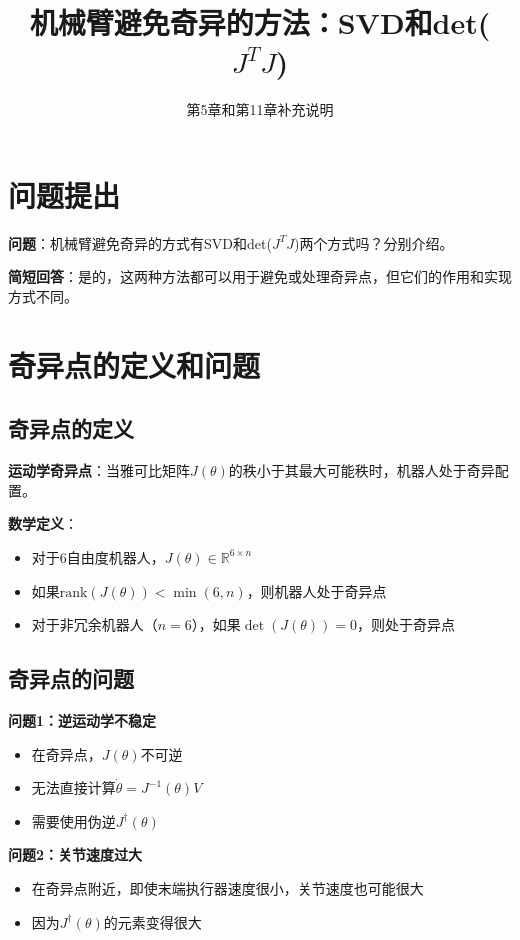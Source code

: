 \documentclass[12pt,a4paper]{article}
\title{机械臂避免奇异的方法：SVD和det($J^T J$)}
\author{第5章和第11章补充说明}
\date{}
\begin{document}
\maketitle

\section{问题提出}

\textbf{问题}：机械臂避免奇异的方式有SVD和det($J^T J$)两个方式吗？分别介绍。

\textbf{简短回答}：是的，这两种方法都可以用于避免或处理奇异点，但它们的作用和实现方式不同。

\section{奇异点的定义和问题}

\subsection{奇异点的定义}

\textbf{运动学奇异点}：当雅可比矩阵$J(\theta)$的秩小于其最大可能秩时，机器人处于奇异配置。

\textbf{数学定义}：
\begin{itemize}
\item 对于6自由度机器人，$J(\theta) \in \mathbb{R}^{6 \times n}$
\item 如果$\text{rank}(J(\theta)) < \min(6, n)$，则机器人处于奇异点
\item 对于非冗余机器人（$n = 6$），如果$\det(J(\theta)) = 0$，则处于奇异点
\end{itemize}

\subsection{奇异点的问题}

\textbf{问题1：逆运动学不稳定}
\begin{itemize}
\item 在奇异点，$J(\theta)$不可逆
\item 无法直接计算$\dot{\theta} = J^{-1}(\theta)V$
\item 需要使用伪逆$J^{\dagger}(\theta)$
\end{itemize}

\textbf{问题2：关节速度过大}
\begin{itemize}
\item 在奇异点附近，即使末端执行器速度很小，关节速度也可能很大
\item 因为$J^{\dagger}(\theta)$的元素变得很大
\end{itemize}
\end{document}
